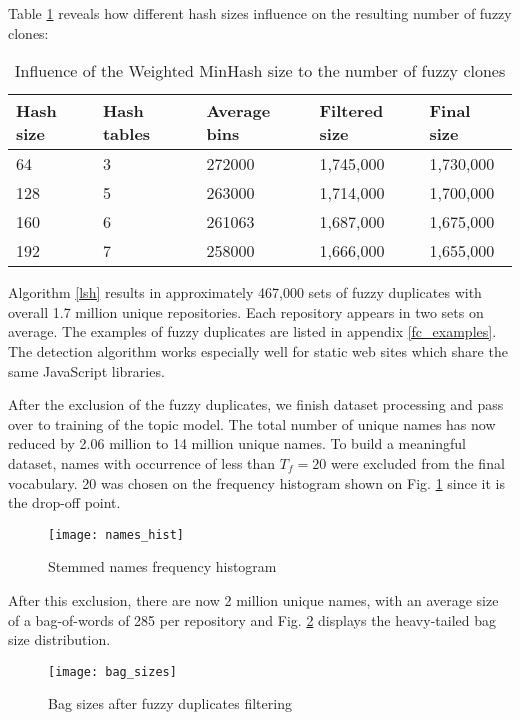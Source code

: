 \documentclass[conference,10pt]{IEEEtran}
\begin{document}
Table \ref{hash_sizes} reveals how different hash sizes influence on the resulting number of fuzzy clones:

\begin{table}
\caption{Influence of the Weighted MinHash size to the number of fuzzy clones}
\label{hash_sizes}
\centering
\begin{tabularx}{0.5\textwidth}{|l|l|l|l|X|}
\hline
\textbf{Hash size} & \textbf{Hash tables} & \textbf{Average bins} & \textbf{Filtered size} & \textbf{Final size} \\
\hline
64 & 3 & 272000 & 1,745,000 & 1,730,000 \\
128 & 5 & 263000 & 1,714,000 & 1,700,000 \\
160 & 6 & 261063 & 1,687,000 & 1,675,000 \\
192 & 7 & 258000 & 1,666,000 & 1,655,000 \\
\hline

\end{tabularx}
\end{table}

Algorithm \ref{lsh} results in approximately 467,000 sets of fuzzy duplicates with overall 1.7 million unique repositories. Each repository appears in two sets on average. The examples of fuzzy duplicates are listed in appendix \ref{fc_examples}.
The detection algorithm works especially well for static web sites which share the same JavaScript libraries.

After the exclusion of the fuzzy duplicates, we finish dataset processing and pass over to training of the topic model. The total number of unique names has now reduced by 2.06 million to 14 million unique names. To build a meaningful dataset, names with occurrence of less than $T_f = 20$ were excluded from the final vocabulary. 20 was chosen on the frequency histogram shown on Fig. \ref{names_hist} since it is the drop-off point. 

\begin{figure}
\caption{Stemmed names frequency histogram}
\label{names_hist}
\begin{center}
\texttt{[image: names\_hist]}
\end{center}
\end{figure}

After this exclusion, there are now 2 million unique names, with an average size of a bag-of-words of 285 per repository and Fig. \ref{bag_sizes} displays the heavy-tailed bag size distribution.

\begin{figure}
\caption{Bag sizes after fuzzy duplicates filtering}
\label{bag_sizes}
\begin{center}
\texttt{[image: bag\_sizes]}
\end{center}
\end{figure}
\end{document}
